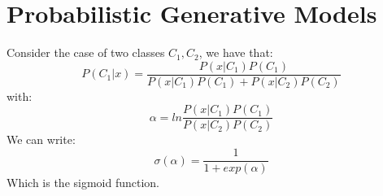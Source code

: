 


\section{Probabilistic Generative Models}
Consider the case of two classes $C_1,C_2$, we have that:
\[P(C_1|x)=\frac{P(x|C_1)P(C_1)}{P(x|C_1)P(C_1)+P(x|C_2)P(C_2)}\]
with:
\[\alpha=ln\frac{P(x|C_1)P(C_1)}{P(x|C_2)P(C_2)}\]
We can write:
\[\sigma(\alpha)=\frac{1}{1+exp(\alpha)}\]
Which is the sigmoid function.